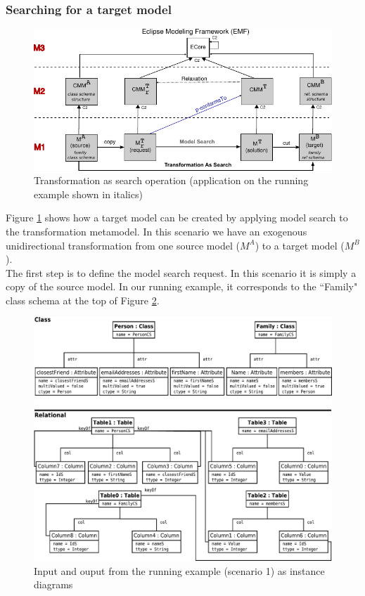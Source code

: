 \documentclass{llncs}
\begin{document}
\subsubsection{Searching for a target model}
%
\begin{figure}[htb]
 \begin{center}
     \includegraphics[scale=1.0]{img/TransformationAsSearch-with_example-lighter.pdf}
\caption{Transformation as search operation (application on the running example shown in italics)}
   \label{fig:TransformationAsSearch}
 \end{center}
\end{figure}
%
Figure \ref{fig:TransformationAsSearch} shows how a target model can be created
by applying model search to the transformation metamodel. In this scenario we have
an exogenous unidirectional transformation from one source model ($M^A$) to a target model
($M^B$).\\
%
The first step is to define the model search request. In this
scenario it is simply a copy of the source model. In our running example, it corresponds to the ``Family" class schema at the top of Figure \ref{fig:transformation-result}.
%
\begin{figure}[htb] \centering \includegraphics[scale=0.35]{img/diagram_scenario1.pdf}
\caption{Input and ouput from the running example (scenario 1) as instance diagrams}
\label{fig:transformation-result}
\end{figure}
\end{document}
